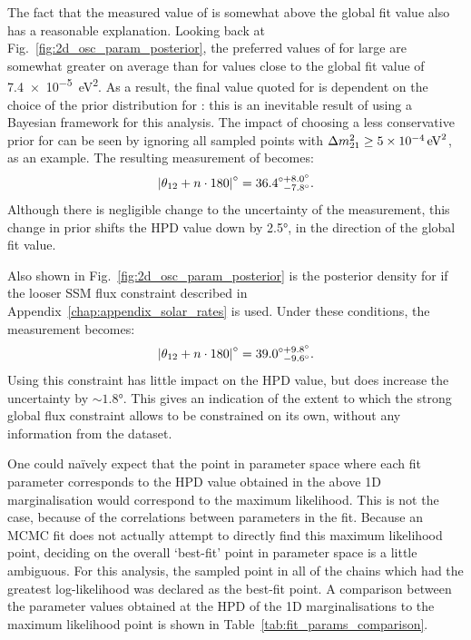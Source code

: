 The fact that the measured value of \tonetwo{} is somewhat above the global fit value also has a reasonable explanation. Looking back at Fig.~\ref{fig:2d_osc_param_posterior}, the preferred values of \tonetwo{} for large \dmsq{} are somewhat greater on average than for \dmsq{} values close to the global fit value of \SI{7.4e-5}{\eV\squared}. As a result, the final value quoted for \tonetwo{} is dependent on the choice of the prior distribution for \dmsq{}: this is an inevitable result of using a Bayesian framework for this analysis. The impact of choosing a less conservative prior for \dmsq{} can be seen by ignoring all sampled points with $\dmsq{} \geq \SI{5e-4}{\eV\squared}$, as an example. The resulting measurement of \tonetwo{} becomes:
\begin{equation*}
    \left|\theta_{12}{} + n\cdot180\right|^{\circ} = 36.4^{\circ+8.0^{\circ}}_{\phantom{\circ}-7.8^{\circ}}.
\end{equation*}
Although there is negligible change to the uncertainty of the measurement, this change in prior shifts the HPD value down by \ang{2.5}, in the direction of the global fit value.

Also shown in Fig.~\ref{fig:2d_osc_param_posterior} is the posterior density for \tonetwo{} if the looser SSM flux constraint described in Appendix~\ref{chap:appendix_solar_rates} is used. Under these conditions, the measurement becomes:
\begin{equation*}
    \left|\theta_{12}{} + n\cdot180\right|^{\circ} = 39.0^{\circ+9.8^{\circ}}_{\phantom{\circ}-9.6^{\circ}}.
\end{equation*}
Using this constraint has little impact on the HPD value, but does increase the uncertainty by $\sim\ang{1.8}$. This gives an indication of the extent to which the strong global flux constraint allows \tonetwo{} to be constrained on its own, without any information from the dataset.

One could na\"{i}vely expect that the point in parameter space where each fit parameter corresponds to the HPD value obtained in the above 1D marginalisation would correspond to the maximum likelihood. This is not the case, because of the correlations between parameters in the fit. Because an MCMC fit does not actually attempt to directly find this maximum likelihood point, deciding on the overall `best-fit' point in parameter space is a little ambiguous. For this analysis, the sampled point in all of the chains which had the greatest log-likelihood was declared as the best-fit point. A comparison between the parameter values obtained at the HPD of the 1D marginalisations to the maximum likelihood point is shown in Table~\ref{tab:fit_params_comparison}.

